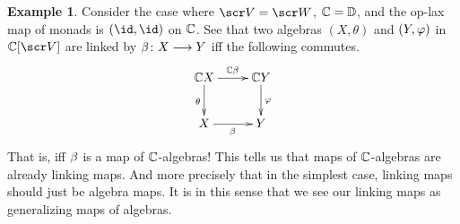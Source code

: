 \documentclass{amsart}
\theoremstyle{definition}
\newtheorem{exmp}[thm]{Example}
\begin{document}
\begin{exmp}\label{rem:Gid}
    Consider the case where $\sV = \sW$, $\mathbb{C} = \mathbb{D}$, and the op-lax map of monads is $(\id,\id)$ on $\mathbb{C}$. See that two algebras $(X,\theta)$ and $(Y,\varphi)$ in $\bC[\sV]$
    are linked by $\beta \colon X \longrightarrow Y$ iff the following commutes.
    \[
    \xymatrix{
        \bC X \ar[d]_{\theta} \ar[r]^{\bC \be} & \bC Y \ar[d]^{\phz}\\
        X \ar[r]_{\be} & Y
    }
    \]
    \noindent That is, iff $\beta$ is a map of $\mathbb{C}$-algebras! This tells us that maps of $\mathbb{C}$-algebras are already linking maps. And more precisely that in the simplest case, linking maps should just be algebra maps. It is in this sense that
    we see our linking maps as generalizing maps of algebras.
\end{exmp}
\end{document}
